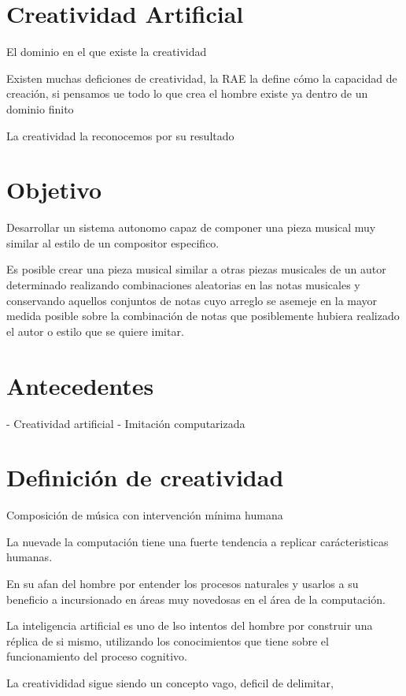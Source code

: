 \section{Creatividad Artificial}

El dominio en el que existe la creatividad


Existen muchas deficiones de creatividad, la RAE la define cómo la capacidad de creación, si pensamos ue todo lo que crea el hombre existe ya dentro de un dominio finito


La creatividad la reconocemos por su resultado



\section{Objetivo}

Desarrollar un sistema autonomo capaz de componer una pieza musical muy similar al estilo de un compositor especifico. 

Es posible crear una pieza musical similar a otras piezas musicales de un autor determinado realizando combinaciones aleatorias en las notas musicales y conservando aquellos conjuntos de notas cuyo arreglo se asemeje en la mayor medida posible sobre la combinación de notas que posiblemente hubiera realizado el autor o estilo que se quiere imitar.



\section{Antecedentes}
- Creatividad artificial
- Imitación computarizada

\section{Definición de creatividad}
Composición de música con intervención mínima humana

La nuevade la computación tiene una fuerte tendencia a replicar carácteristicas humanas.

En su afan del hombre por entender los procesos naturales y usarlos a su beneficio a incursionado en áreas muy novedosas en el área de la computación.

La inteligencia artificial es uno de lso intentos del hombre por construir una réplica de si mismo, utilizando los conocimientos que tiene sobre el funcionamiento del proceso cognitivo.

La creativididad sigue siendo un concepto vago, deficil de delimitar, 

